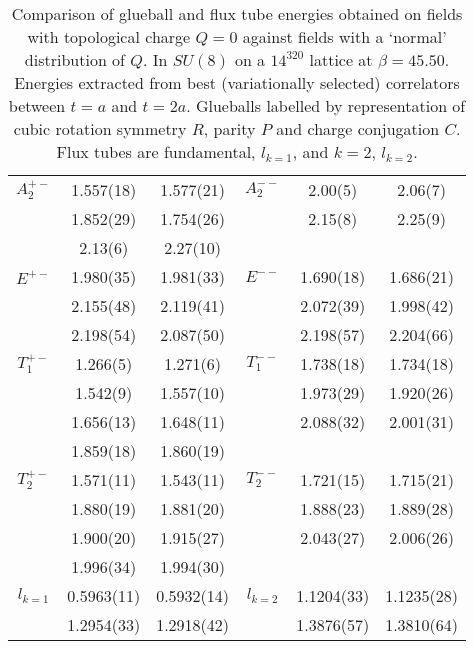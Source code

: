\documentclass[12pt]{article}
\begin{document}
\begin{table}[htb]
\begin{tabular}{|c|c|c||c|c|c|}
$A_2^{+-}$  & 1.557(18) & 1.577(21) & $A_2^{--}$ & 2.00(5)  & 2.06(7)  \\
          & 1.852(29)  & 1.754(26) &          & 2.15(8)  & 2.25(9)  \\
          & 2.13(6)    & 2.27(10)  &          &          &           \\ \hline
$E^{+-}$   & 1.980(35)  & 1.981(33) & $E^{--}$ & 1.690(18) & 1.686(21)  \\
          & 2.155(48)  & 2.119(41) &          & 2.072(39) & 1.998(42)  \\
          & 2.198(54)  & 2.087(50) &          & 2.198(57) & 2.204(66)  \\ \hline
$T_1^{+-}$  & 1.266(5)   & 1.271(6)  & $T_1^{--}$ & 1.738(18) & 1.734(18)  \\
          & 1.542(9)   & 1.557(10) &          & 1.973(29) &  1.920(26) \\
          & 1.656(13)  & 1.648(11) &          & 2.088(32) &  2.001(31) \\
          & 1.859(18)  & 1.860(19) &          &           &    \\ \hline
$T_2^{+-}$  & 1.571(11)  & 1.543(11) & $T_2^{--}$ & 1.721(15) & 1.715(21)  \\
          & 1.880(19)  & 1.881(20) &          & 1.888(23) & 1.889(28)  \\
          & 1.900(20)  & 1.915(27) &          & 2.043(27) & 2.006(26)  \\
          & 1.996(34)  & 1.994(30) &          &           &          \\ \hline \hline
$l_{k=1}$  & 0.5963(11) & 0.5932(14) & $l_{k=2}$ & 1.1204(33) & 1.1235(28)  \\
          & 1.2954(33) & 1.2918(42) &           & 1.3876(57)  & 1.3810(64)  \\ \hline
\end{tabular}
\caption{Comparison of glueball and flux tube energies obtained on fields with
  topological charge $Q=0$ against fields with a `normal' distribution of $Q$.
  In $SU(8)$ on a $14^320$ lattice at $\beta=45.50$. Energies extracted
  from best (variationally selected)  correlators between $t=a$ and $t=2a$.
  Glueballs labelled by representation of cubic rotation symmetry $R$, parity $P$ and charge
  conjugation $C$. Flux tubes are fundamental, $l_{k=1}$, and $k=2$, $l_{k=2}$.}
\label{table_GKvsQ_SU8_l14}
\end{table}


\end{document}
